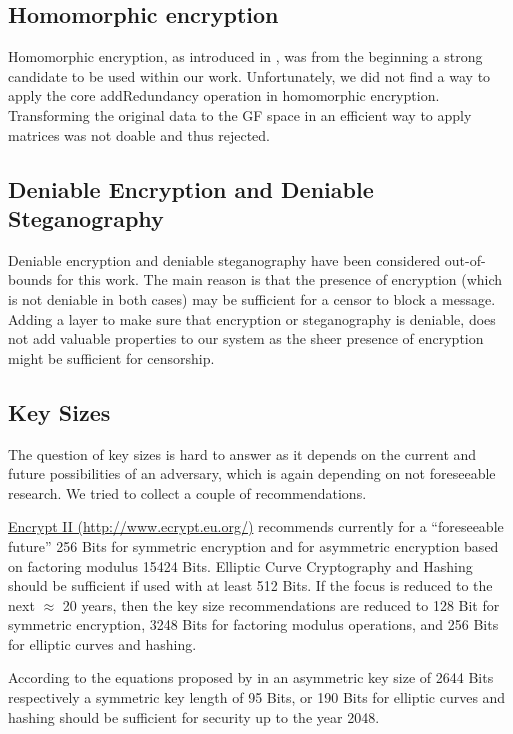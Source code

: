 \subsection{Homomorphic encryption}
Homomorphic encryption, as introduced in \cite{feldman1987practical}, was from the beginning a strong candidate to be used within our work. Unfortunately, we did not find a way to apply the core addRedundancy operation in homomorphic encryption. Transforming the original data to the GF space in an efficient way to apply matrices was not doable and thus rejected.


\subsection{Deniable Encryption and Deniable Steganography}

Deniable encryption and deniable steganography have been considered out-of-bounds for this work. The main reason is that the presence of encryption (which is not deniable in both cases) may be sufficient for a censor to block a message. Adding a layer to make sure that encryption or steganography is deniable, does not add valuable properties to our system as the sheer presence of encryption might be sufficient for censorship. 

\subsection{Key Sizes\label{sec:keySize}}

The question of key sizes is hard to answer as it depends on the current and future possibilities of an adversary, which is again depending on not foreseeable research. We tried to collect a couple of recommendations.

\href{http://www.ecrypt.eu.org/}{Encrypt II (http://www.ecrypt.eu.org/)} recommends currently for a ``foreseeable future'' 256 Bits for symmetric encryption and for asymmetric encryption based on factoring modulus 15424 Bits. Elliptic Curve Cryptography and Hashing should be sufficient if used with at least 512 Bits. If the focus is reduced to the next $\approx$ 20 years, then the key size recommendations are reduced to 128 Bit for symmetric encryption, 3248 Bits for factoring modulus operations, and 256 Bits for elliptic curves and hashing.

According to the equations proposed by \citeauthor{Lenstra04keylength.} in \cite{Lenstra04keylength.} an asymmetric key size of 2644 Bits respectively a symmetric key length of 95 Bits, or 190 Bits for elliptic curves and hashing should be sufficient for security up to the year 2048. 

